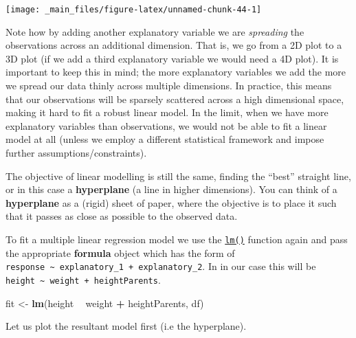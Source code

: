 \documentclass[]{book}
\newenvironment{Shaded}{\begin{snugshade}}{\end{snugshade}}
\newcommand{\KeywordTok}[1]{\textcolor[rgb]{0.13,0.29,0.53}{\textbf{#1}}}
\newcommand{\DataTypeTok}[1]{\textcolor[rgb]{0.13,0.29,0.53}{#1}}
\newcommand{\DecValTok}[1]{\textcolor[rgb]{0.00,0.00,0.81}{#1}}
\newcommand{\StringTok}[1]{\textcolor[rgb]{0.31,0.60,0.02}{#1}}
\newcommand{\OtherTok}[1]{\textcolor[rgb]{0.56,0.35,0.01}{#1}}
\newcommand{\OperatorTok}[1]{\textcolor[rgb]{0.81,0.36,0.00}{\textbf{#1}}}
\newcommand{\NormalTok}[1]{#1}
\theoremstyle{definition}
\theoremstyle{definition}
\theoremstyle{definition}
\theoremstyle{remark}
\begin{document}
\begin{center}\texttt{[image: \_main\_files/figure-latex/unnamed-chunk-44-1]} \end{center}

Note how by adding another explanatory variable we are \emph{spreading}
the observations across an additional dimension. That is, we go from a
2D plot to a 3D plot (if we add a third explanatory variable we would
need a 4D plot). It is important to keep this in mind; the more
explanatory variables we add the more we spread our data thinly across
multiple dimensions. In practice, this means that our observations will
be sparsely scattered across a high dimensional space, making it hard to
fit a robust linear model. In the limit, when we have more explanatory
variables than observations, we would not be able to fit a linear model
at all (unless we employ a different statistical framework and impose
further assumptions/constraints).

The objective of linear modelling is still the same, finding the
``best'' straight line, or in this case a \textbf{hyperplane} (a line in
higher dimensions). You can think of a \textbf{hyperplane} as a (rigid)
sheet of paper, where the objective is to place it such that it passes
as close as possible to the observed data.

To fit a multiple linear regression model we use the
\href{https://www.rdocumentation.org/packages/stats/versions/3.5.1/topics/lm}{\texttt{lm()}}
function again and pass the appropriate \textbf{formula} object which
has the form of
\texttt{response\ \textasciitilde{}\ explanatory\_1\ +\ explanatory\_2}.
In in our case this will be
\texttt{height\ \textasciitilde{}\ weight\ +\ heightParents}.

\begin{Shaded}
\begin{Highlighting}[]
\NormalTok{fit <-}\StringTok{ }\KeywordTok{lm}\NormalTok{(height }\OperatorTok{~}\StringTok{ }\NormalTok{weight }\OperatorTok{+}\StringTok{ }\NormalTok{heightParents, df)}
\end{Highlighting}
\end{Shaded}

Let us plot the resultant model first (i.e the hyperplane).

\begin{Shaded}
\end{Shaded}
\end{document}

